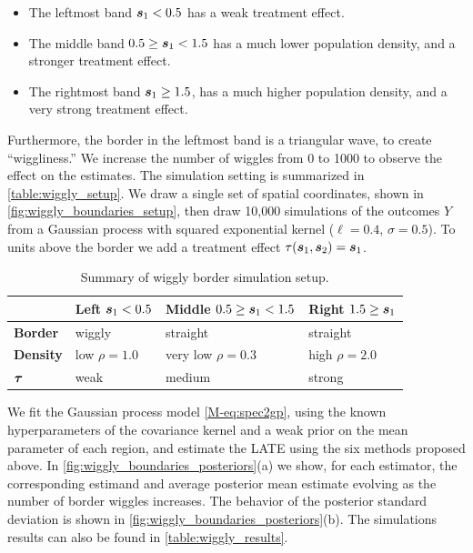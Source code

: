 \documentclass[letter,12pt]{article}
\begin{document}
\begin{itemize}
\item
  The leftmost band \(\bm{s}_1 < 0.5\) has a weak treatment effect.
\item
  The middle band \(0.5 \ge \bm{s}_1 < 1.5\) has a much lower population density, and a stronger treatment effect.
\item
  The rightmost band \(\bm{s}_1 \ge 1.5\), has a much higher population density, and a very strong treatment effect.
\end{itemize}

Furthermore, the border in the leftmost band is a triangular wave, to create ``wiggliness.''
We increase the number of wiggles from 0 to 1000 to observe the effect on the estimates.
The simulation setting is summarized in \autoref{table:wiggly_setup}.
We draw a single set of spatial coordinates, shown in \autoref{fig:wiggly_boundaries_setup}, then draw 10,000 simulations of the outcomes \(Y\) from a Gaussian process with squared exponential kernel (\(\ell=0.4\), \(\sigma=0.5\)).
To units above the border we add a treatment effect \(\tau(\bm{s}_1, \bm{s}_2) = \bm{s}_1\).



\begin{table}[tbp]
\centering
\bgroup
\def\arraystretch{1.1}%
\begin{tabular}{llll}
\hline
& Left \(\bm{s}_1< 0.5\) & Middle \(0.5 \ge \bm{s}_1 < 1.5\) & Right \(1.5 \ge \bm{s}_1\)\tabularnewline
\hline
\textbf{Border} & wiggly & straight & straight\tabularnewline
\textbf{Density} & low \(\rho=1.0\) & very low \(\rho=0.3\) & high \(\rho=2.0\)\tabularnewline
\(\bm{\tau}\) & weak & medium & strong\tabularnewline
\hline
\end{tabular}
\egroup
\caption{Summary of wiggly border simulation setup. \label{table:wiggly_setup}}
\end{table}

        We fit the Gaussian process model \autoref*{M-eq:spec2gp},
using the known hyperparameters of the covariance kernel and a weak prior on the mean parameter of each region,
and estimate the LATE using the six methods proposed above.
In \autoref{fig:wiggly_boundaries_posteriors}(a) we show, for each estimator, the corresponding estimand and average posterior mean estimate evolving as the number of border wiggles increases.
The behavior of the posterior standard deviation is shown in \autoref{fig:wiggly_boundaries_posteriors}(b).
The simulations results can also be found in \autoref{table:wiggly_results}.
\end{document}
